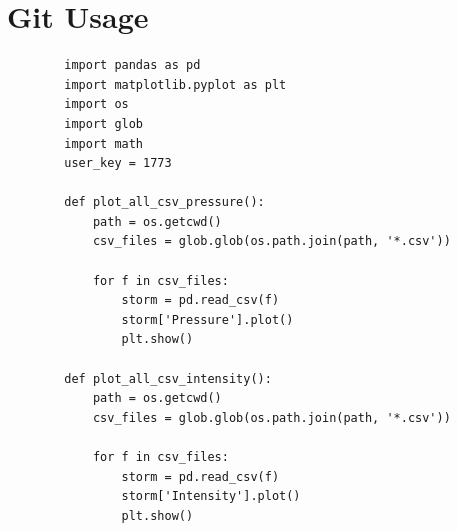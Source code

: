 \documentclass[]{article}
\begin{document}
\section{Git Usage}
\begin{tcolorbox}[enhanced, 
    listing only,
    title=Python Code for Plotting CSV Data,
    fonttitle=\bfseries,
    colback=white,
    colframe=black!70,
    listing options={
      language=Python,
      numbers=left, 
      numberstyle=\tiny\color{gray},
      breaklines=true, 
      basicstyle=\ttfamily\small, 
      columns=fullflexible,
      keepspaces=true,
      showstringspaces=true,
    },]
    \begin{verbatim}
        import pandas as pd
        import matplotlib.pyplot as plt
        import os
        import glob
        import math
        user_key = 1773
        
        def plot_all_csv_pressure():
            path = os.getcwd()
            csv_files = glob.glob(os.path.join(path, '*.csv'))
            
            for f in csv_files:
                storm = pd.read_csv(f)
                storm['Pressure'].plot()
                plt.show()
        
        def plot_all_csv_intensity():
            path = os.getcwd()
            csv_files = glob.glob(os.path.join(path, '*.csv'))
            
            for f in csv_files:
                storm = pd.read_csv(f)
                storm['Intensity'].plot()
                plt.show()
    \end{verbatim}
\end{tcolorbox}
\end{document}
